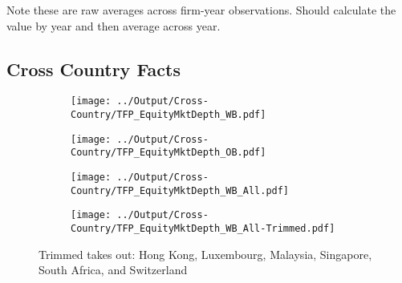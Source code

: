 \documentclass[12pt,notitlepage]{article}
\begin{document}
\begin{table}[!htpb]
\caption{French Summary Statistics}
Note these are raw averages across firm-year observations. Should calculate the value by year and then average across year.
\end{table}


\clearpage



\FloatBarrier
\subsection{Cross Country Facts} %
\label{sec:cross_country_facts}
\FloatBarrier



\begin{figure}[!htpb]
\centering
\caption{Total Factor Productivity (European Countries)}
\begin{subfigure}{.49\textwidth}
    \centering
 \texttt{[image: ../Output/Cross-Country/TFP\_EquityMktDepth\_WB.pdf]}
\end{subfigure}
\begin{subfigure}{.49\textwidth}
    \centering
  \texttt{[image: ../Output/Cross-Country/TFP\_EquityMktDepth\_OB.pdf]}
\end{subfigure}
\end{figure}
\FloatBarrier




\begin{figure}[!htpb]
\centering
\caption{Total Factor Productivity (All Countries)}
\begin{subfigure}{.49\textwidth}
    \centering
 \texttt{[image: ../Output/Cross-Country/TFP\_EquityMktDepth\_WB\_All.pdf]}
\end{subfigure}
\begin{subfigure}{.49\textwidth}
    \centering
  \texttt{[image: ../Output/Cross-Country/TFP\_EquityMktDepth\_WB\_All-Trimmed.pdf]}
\end{subfigure}
Trimmed takes out: Hong Kong, Luxembourg, Malaysia, Singapore, South Africa, and Switzerland
\end{figure}
\end{document}
